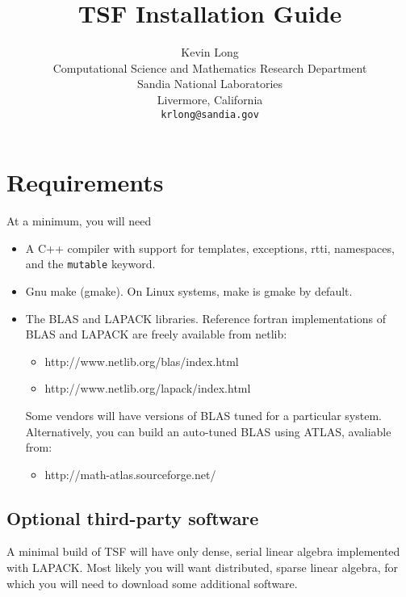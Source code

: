 \documentclass[10pt]{article}
\begin{document}
%



\title{TSF Installation Guide}

\author{Kevin Long\\Computational Science and Mathematics Research Department\\
Sandia National Laboratories\\Livermore, California\\{\tt krlong@sandia.gov}}

\maketitle


\tableofcontents

\section{Requirements}

At a minimum, you will need 

\begin{itemize}
\item A C++ compiler with support for templates, exceptions, rtti, namespaces, and
the {\tt mutable} keyword. 
\item Gnu make (gmake). On Linux systems, make is gmake by default.
\item The BLAS and LAPACK libraries. Reference fortran
implementations of BLAS and LAPACK are freely available from netlib:
\begin{itemize}
\item http://www.netlib.org/blas/index.html
\item http://www.netlib.org/lapack/index.html
\end{itemize}
Some vendors will have versions of BLAS tuned for a particular system. Alternatively,
you can build an auto-tuned BLAS using ATLAS, avaliable from:
\begin{itemize}
\item http://math-atlas.sourceforge.net/
\end{itemize}
\end{itemize}

\subsection{Optional third-party software}

A minimal build of TSF will have only 
dense, serial linear algebra implemented with LAPACK. Most likely you will want
distributed, sparse linear algebra, for which you will need to download some additional
software.
\end{document}
